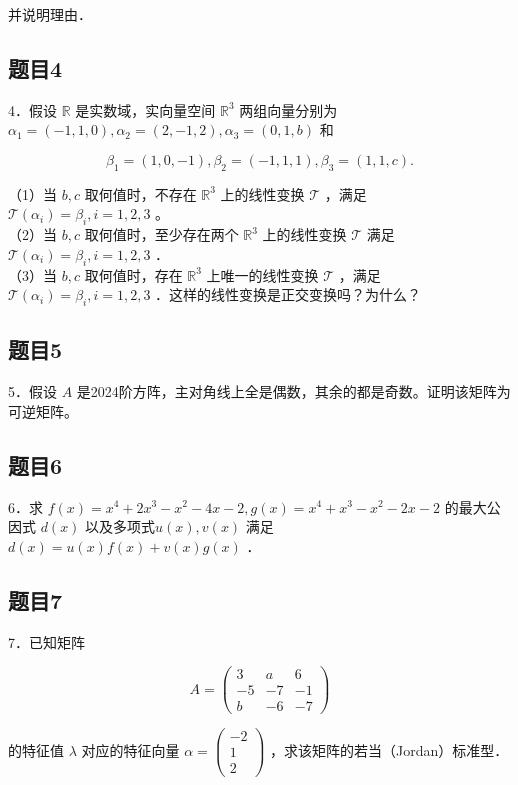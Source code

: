 \documentclass{article}
\begin{document}
并说明理由．

\subsection{题目4}
4．假设 \(\mathbb{R}\) 是实数域，实向量空间 \(\mathbb{R}^{3}\) 两组向量分别为 \(\alpha_{1}=(-1,1,0), \alpha_{2}=(2,-1,2), \alpha_{3}=(0,1, b)\) 和

\[
\beta_{1}=(1,0,-1), \beta_{2}=(-1,1,1), \beta_{3}=(1,1, c) .
\]

（1）当 \(b, c\) 取何值时，不存在 \(\mathbb{R}^{3}\) 上的线性变换 \(\mathcal{T}\) ，满足 \(\mathcal{T}\left(\alpha_{i}\right)=\beta_{i}, i=1,2,3\) 。\\
（2）当 \(b, c\) 取何值时，至少存在两个 \(\mathbb{R}^{3}\) 上的线性变换 \(\mathcal{T}\) 满足 \(\mathcal{T}\left(\alpha_{i}\right)=\beta_{i}, i=1,2,3\) ．\\
（3）当 \(b, c\) 取何值时，存在 \(\mathbb{R}^{3}\) 上唯一的线性变换 \(\mathcal{T}\) ，满足 \(\mathcal{T}\left(\alpha_{i}\right)=\beta_{i}, i=1,2,3\) ．这样的线性变换是正交变换吗？为什么？

\subsection{题目5}
5．假设 \(A\) 是2024阶方阵，主对角线上全是偶数，其余的都是奇数。证明该矩阵为可逆矩阵。

\subsection{题目6}
6．求 \(f(x)=x^{4}+2 x^{3}-x^{2}-4 x-2, g(x)=x^{4}+x^{3}-x^{2}-2 x-2\) 的最大公因式 \(d(x)\) 以及多项式\(u(x), v(x)\) 满足 \(d(x)=u(x) f(x)+v(x) g(x)\) ．

\subsection{题目7}
7．已知矩阵

\[
A=\left(\begin{array}{ccc}
3 & a & 6 \\
-5 & -7 & -1 \\
b & -6 & -7
\end{array}\right)
\]

的特征值 \(\lambda\) 对应的特征向量 \(\alpha=\left(\begin{array}{c}-2 \\ 1 \\ 2\end{array}\right)\) ，求该矩阵的若当（Jordan）标准型．
\end{document}
